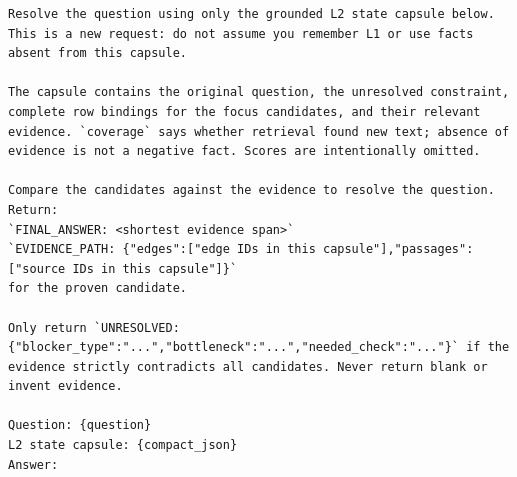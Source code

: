 \documentclass[runningheads]{llncs}
\begin{document}
\begin{lstlisting}[caption={Tier 2 Prompt Template (Targeted Reader over Minimal State Capsule)}]
Resolve the question using only the grounded L2 state capsule below. This is a new request: do not assume you remember L1 or use facts absent from this capsule.

The capsule contains the original question, the unresolved constraint, complete row bindings for the focus candidates, and their relevant evidence. `coverage` says whether retrieval found new text; absence of evidence is not a negative fact. Scores are intentionally omitted.

Compare the candidates against the evidence to resolve the question. Return:
`FINAL_ANSWER: <shortest evidence span>`
`EVIDENCE_PATH: {"edges":["edge IDs in this capsule"],"passages":["source IDs in this capsule"]}`
for the proven candidate. 

Only return `UNRESOLVED: {"blocker_type":"...","bottleneck":"...","needed_check":"..."}` if the evidence strictly contradicts all candidates. Never return blank or invent evidence.

Question: {question}
L2 state capsule: {compact_json}
Answer:
\end{lstlisting}
\end{document}
